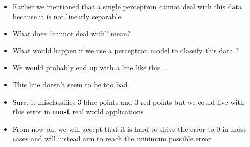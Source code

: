 \documentclass[serif, aspectratio=169]{beamer}
\begin{document}
\begin{frame}
\begin{columns}
\begin{overlayarea}{\textwidth}{\textheight}

\end{overlayarea}

\begin{overlayarea}{\textwidth}{\textheight}
\begin{itemize}\justifying
\item<1-> Earlier we mentioned that a single perceptron cannot deal with this data because it is not linearly separable
\item<2-> What does ``cannot deal with'' mean?
\item<3-> What would happen if we use a perceptron model to classify this data ?
\item<4-> We would probably end up with a line like this ...
\item<5-> This line doesn't seem to be too bad 
\item<6-> Sure, it misclassifies 3 blue points and 3 red points but we could live with this error in \textbf{most} real world applications
\item<7-> From now on, we will accept that it is hard to drive the error to 0 in most cases and will instead aim to reach the minimum possible error
\end{itemize}
\end{overlayarea}
\end{columns}
\end{frame}
\end{document}
